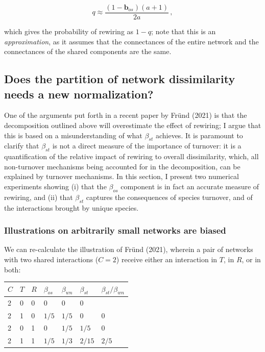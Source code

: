 \documentclass[11pt]{article}
\begin{document}
\[q \approx \frac{(1-\mathbf{b}_{os})(a+1)}{2a}\,,\]

which gives the probability of rewiring as \(1-q\); note that this is an
\emph{approximation}, as it assumes that the connectances of the entire
network and the connectances of the shared components are the same.

\hypertarget{does-the-partition-of-network-dissimilarity-needs-a-new-normalization}{%
\subsection{Does the partition of network dissimilarity needs a new
normalization?}\label{does-the-partition-of-network-dissimilarity-needs-a-new-normalization}}

One of the arguments put forth in a recent paper by Fründ (2021) is that
the decomposition outlined above will overestimate the effect of
rewiring; I argue that this is based on a misunderstanding of what
\(\beta_{st}\) achieves. It is paramount to clarify that \(\beta_{st}\)
is not a direct measure of the importance of turnover: it is a
quantification of the relative impact of rewiring to overall
dissimilarity, which, all non-turnover mechanisms being accounted for in
the decomposition, can be explained by turnover mechanisms. In this
section, I present two numerical experiments showing (i) that the
\(\beta_{os}\) component is in fact an accurate measure of rewiring, and
(ii) that \(\beta_{st}\) captures the consequences of species turnover,
and of the interactions brought by unique species.

\hypertarget{illustrations-on-arbitrarily-small-networks-are-biased}{%
\subsubsection{Illustrations on arbitrarily small networks are
biased}\label{illustrations-on-arbitrarily-small-networks-are-biased}}

We can re-calculate the illustration of Fründ (2021), wherein a pair of
networks with two shared interactions (\(C = 2\)) receive either an
interaction in \(T\), in \(R\), or in both:

\begin{longtable}[]{@{}lllllll@{}}
\toprule
\(C\) & \(T\) & \(R\) & \(\beta_{os}\) & \(\beta_{wn}\) & \(\beta_{st}\)
& \(\beta_{st}/\beta_{wn}\)\tabularnewline
\midrule
\endhead
2 & 0 & 0 & 0 & 0 & 0 &\tabularnewline
2 & 1 & 0 & \(1/5\) & \(1/5\) & 0 & 0\tabularnewline
2 & 0 & 1 & 0 & \(1/5\) & \(1/5\) & 0\tabularnewline
2 & 1 & 1 & \(1/5\) & \(1/3\) & \(2/15\) & \(2/5\)\tabularnewline
\bottomrule
\end{longtable}
\end{document}
